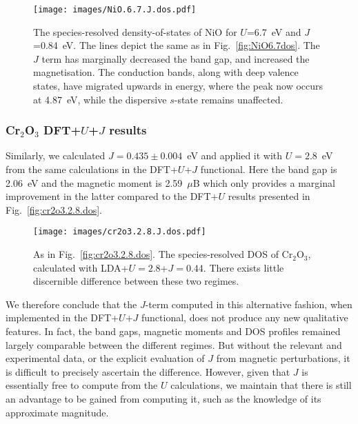 \begin{figure}[th!]
\centering
\texttt{[image: images/NiO.6.7.J.dos.pdf]}
\caption[Species-resolved DOS for NiO calculated with PBE+$U$+$J$]
{The species-resolved density-of-states of NiO 
for $U$=6.7~eV and $J$=0.84~eV.
%
The lines depict the same as in Fig.~\ref{fig:NiO6.7dos}.
%
The $J$ term has marginally decreased the band gap, 
and increased the magnetisation.
%
The conduction bands, 
along with deep valence states, 
have migrated upwards in energy, 
where the peak now occurs at 4.87~eV, 
while the dispersive $s$-state remains unaffected.
}
\label{fig:NiO6.7Jdos}
\end{figure}

\subsubsection{Cr$_2$O$_3$ DFT+$U$+$J$ results}

Similarly, 
we calculated $J=0.435\pm0.004$~eV 
and applied it with $U=2.8$~eV from the same calculations 
in the DFT+$U$+$J$ functional.
%
%
Here 
the band gap is 2.06~eV 
and the magnetic moment is 2.59~$\mu$B
which only provides a marginal  
improvement in the latter  
compared to the DFT+$U$ results 
presented in Fig.~\ref{fig:cr2o3.2.8.dos}.

\begin{figure}[th!]
\centering
\texttt{[image: images/cr2o3.2.8.J.dos.pdf]}
\caption[Species-resolved DOS for Cr$_2$O$_3$ calculated with PBE+$U$+$J$]
{As in Fig.~\ref{fig:cr2o3.2.8.dos}. 
The species-resolved DOS of Cr$_2$O$_3$, 
calculated with LDA+$U=2.8$+$J=0.44$.
%
There exists little discernible difference 
between these two regimes.}
\label{fig:cr2o3.2.8.J.dos}
\end{figure}

{
We therefore conclude that the $J$-term  
computed in this alternative fashion, 
when implemented in the DFT+$U$+$J$ functional, 
does not produce any new qualitative features.
%
In fact, 
the band gaps, magnetic moments 
and DOS profiles remained largely comparable 
between the different regimes.
%
But without the relevant and experimental data, 
or the explicit evaluation of $J$ from magnetic perturbations, 
it is difficult to precisely ascertain the difference.
%
However, 
given that $J$ is essentially free to compute from the $U$ calculations, 
we maintain that there is still an advantage to be gained 
from computing it, 
such as the knowledge of its approximate magnitude.}

